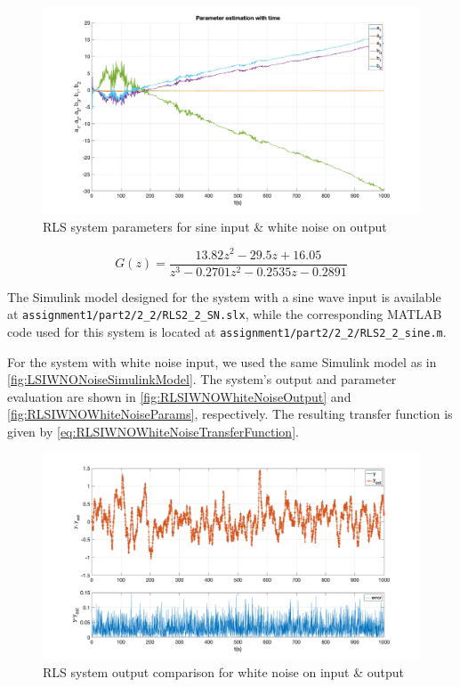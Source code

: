 \begin{figure}
	\centering
	\includegraphics[totalheight=8cm]{images/RLSIWNOSineParams.png}
	\caption{RLS system parameters for sine input \& white noise on output}
	\label{fig:RLSIWNOSineParams}
\end{figure}

\begin{equation}
	G(z) =	\frac{ 13.82 z^2 - 29.5 z + 16.05}{z^3 - 0.2701 z^2 - 0.2535 z - 0.2891}
	\label{eq:RLSIWNOSineTransferFunction}
\end{equation}

The Simulink model designed for the system with a sine wave input is available at \lstinline|assignment1/part2/2_2/RLS2_2_SN.slx|, while the corresponding MATLAB code used for this system is located at \lstinline|assignment1/part2/2_2/RLS2_2_sine.m|.


For the system with white noise input, we used the same Simulink model as in \autoref{fig:LSIWNONoiseSimulinkModel}. The system's output and parameter evaluation are shown in \autoref{fig:RLSIWNOWhiteNoiseOutput} and \autoref{fig:RLSIWNOWhiteNoiseParams}, respectively. The resulting transfer function is given by \autoref{eq:RLSIWNOWhiteNoiseTransferFunction}.

\begin{figure}
	\centering
	\includegraphics[totalheight=8cm]{images/RLSIWNOWhiteNoiseOutput.png}
	\caption{RLS system output comparison for white noise on input \& output}
	\label{fig:RLSIWNOWhiteNoiseOutput}
\end{figure}

